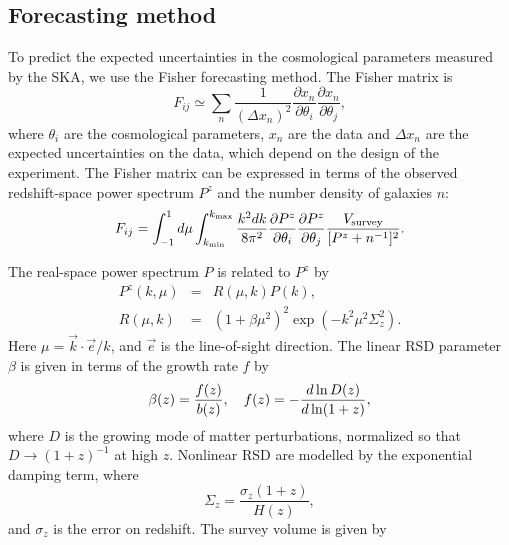 \documentclass[useAMS,usenatbib]{mn2e}
\begin{document}
\subsection{Forecasting method}

To predict the expected uncertainties in the cosmological parameters measured by the SKA, we use the Fisher forecasting method.
 The Fisher matrix is
\begin{equation}
 F_{ij} \simeq \sum_n \frac{1}{(\Delta x_n)^2}\frac{\partial
    x_n}{\partial \theta_i}\frac{\partial x_n}{\partial
  \theta_j} ,
\end{equation}
where $\theta_i$ are the cosmological parameters, $x_n$ are the data and $\Delta {x_n}$ are  the expected uncertainties on the data, which  depend on the design of the experiment.
The Fisher matrix  can be expressed in terms of the observed redshift-space power spectrum $P^z$ and the number density of galaxies $n$:
\begin{eqnarray}  
F_{ij}=
\int_{-1}^{1}d\mu \int_{k_{\rm min}}^{{k_{\rm max}}} {k^2dk\over 8\pi^2} \frac{\partial  P^z}{\partial \theta_i} \frac{\partial P^z}{\partial \theta_j}
{V_{\rm survey}\over [P^z+n^{-1}]^2}.
 \label{eq:Fij}
\end{eqnarray}

The real-space power spectrum $P$ is related to $P^z$ by
\begin{eqnarray}
P^z(k,\mu)&=& R(\mu,k)P(k),\\
R(\mu,k)& =& (1+\beta\mu^2)^2\exp{\left(-k^2\mu^2\Sigma_z^2 \right)}.\label{eq:Rsig}
\end{eqnarray}
Here $\mu=\vec{k}\cdot\vec{e}/k$, and $\vec{e}$ is the line-of-sight direction. 
The linear RSD parameter $\beta$ is given in terms of the growth rate $f$ by \citep{Komatsu:2008hk}
\begin{equation}
     \beta(z)=\frac{f(z)}{ b(z)},~~~f(z)=-{d\ln D(z) \over d\ln (1+z)},
\end{equation}
where $D$ is the growing mode of matter perturbations, normalized so that $D\to (1+z)^{-1}$ at high $z$.
Nonlinear RSD are modelled by the exponential damping term, where
\begin{equation}
\Sigma_z= \frac{\sigma_z (1 +z)}{H(z)},
\end{equation}
and $\sigma_z$ is the error on redshift. The survey volume is given by
\end{document}
